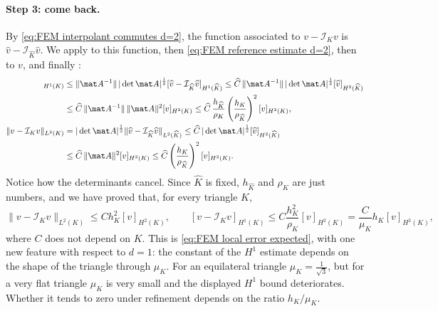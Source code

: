 \paragraph{Step 3: come back.}
By \eqref{eq:FEM interpolant commutes d=2}, the function associated to $v - \mathcal I_K v$ is $\widehat v - \mathcal I_{\widehat K} \widehat v$.
We apply  to this function, then \eqref{eq:FEM reference estimate d=2}, then  to $v$, and finally :
\begin{align*}
    [ v - \mathcal I_K v ]_{H^1(K)}
     & \le \|\mat A^{-1}\|\, |\det \mat A|^{\frac 1 2} [ \widehat v - \mathcal I_{\widehat K} \widehat v ]_{H^1(\widehat K)}
    \le \widehat C\, \|\mat A^{-1}\|\, |\det \mat A|^{\frac 1 2} [ \widehat v ]_{H^2(\widehat K)}
    \\
     & \le \widehat C\, \|\mat A^{-1}\|\, \|\mat A\|^2 [ v ]_{H^2(K)}
    \le \widehat C\, \frac{h_{\widehat K}}{\rho_K} \left( \frac{h_K}{\rho_{\widehat K}} \right)^2 [ v ]_{H^2(K)},
    \\
    \| v - \mathcal I_K v \|_{L^2(K)}
     & = |\det \mat A|^{\frac 1 2} \| \widehat v - \mathcal I_{\widehat K} \widehat v \|_{L^2(\widehat K)}
    \le \widehat C\, |\det \mat A|^{\frac 1 2} [ \widehat v ]_{H^2(\widehat K)}
    \\
     & \le \widehat C\, \|\mat A\|^2 [ v ]_{H^2(K)}
    \le \widehat C \left( \frac{h_K}{\rho_{\widehat K}} \right)^2 [ v ]_{H^2(K)}.
\end{align*}
Notice how the determinants cancel.
Since $\widehat K$ is fixed, $h_{\widehat K}$ and $\rho_{\widehat K}$ are just numbers, and we have proved that, for every triangle $K$,
\begin{equation}
    \label{eq:FEM local error linear triangle}
    \| v - \mathcal I_K v \|_{L^2(K)} \le C h_K^2 [ v ]_{H^2(K)},
    \qquad
    [ v - \mathcal I_K v ]_{H^1(K)} \le C \frac{h_K^2}{\rho_K} [ v ]_{H^2(K)} = \frac{C}{\mu_K} h_K [ v ]_{H^2(K)},
\end{equation}
where $C$ does not depend on $K$.
This is \eqref{eq:FEM local error expected}, with one new feature with respect to $d = 1$: the constant of the $H^1$ estimate depends on the shape of the triangle through $\mu_K$.
For an equilateral triangle $\mu_K = \frac{1}{\sqrt 3}$, but for a very flat triangle $\mu_K$ is very small and the displayed $H^1$ bound deteriorates. Whether it tends to zero under refinement depends on the ratio $h_K/\mu_K$.

